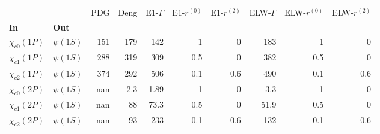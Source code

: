 \begin{tabular}{l|l|r|r|r|r|r|r|r|r}
\toprule
                &            &  PDG &  Deng &  E1-$\Gamma$ &  E1-$r^{(0)}$ &  E1-$r^{(2)}$ &  ELW-$\Gamma$ &  ELW-$r^{(0)}$ &  ELW-$r^{(2)}$ \\
\textbf{In} & \textbf{Out} &      &       &              &               &               &               &                &                \\
\midrule
\textbf{$\chi_{c0}(1P)$} & \textbf{$\psi(1S)$} &  151 &   179 &          142 &             1 &             0 &           183 &              1 &              0 \\
\textbf{$\chi_{c1}(1P)$} & \textbf{$\psi(1S)$} &  288 &   319 &          309 &           0.5 &             0 &           382 &            0.5 &              0 \\
\textbf{$\chi_{c2}(1P)$} & \textbf{$\psi(1S)$} &  374 &   292 &          506 &           0.1 &           0.6 &           490 &            0.1 &            0.6 \\
\textbf{$\chi_{c0}(2P)$} & \textbf{$\psi(1S)$} &  nan &   2.3 &         1.89 &             1 &             0 &           3.3 &              1 &              0 \\
\textbf{$\chi_{c1}(2P)$} & \textbf{$\psi(1S)$} &  nan &    88 &         73.3 &           0.5 &             0 &          51.9 &            0.5 &              0 \\
\textbf{$\chi_{c2}(2P)$} & \textbf{$\psi(1S)$} &  nan &    93 &          233 &           0.1 &           0.6 &           132 &            0.1 &            0.6 \\
\bottomrule
\end{tabular}
